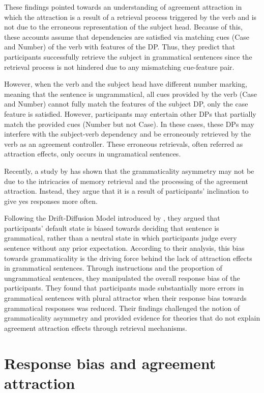 These findings pointed towards an understanding of agreement attraction in which the attraction is a result of a retrieval process triggered by the verb and is not due to the erroneous representation of the subject head. Because of this, these accounts assume that dependencies are satisfied via matching cues ({Case} and {Number}) of the verb with features of the DP. Thus, they predict that participants successfully retrieve the subject in grammatical sentences since the retrieval process is not hindered due to any mismatching cue-feature pair. 

However, when the verb and the subject head have different number marking, meaning that the sentence is ungrammatical, all cues provided by the verb ({Case} and {Number}) cannot fully match the features of the subject DP, only the case feature is satisfied. However, participants may entertain other DPs that partially match the provided cues ({Number} but not {Case}). In these cases, these DPs may interfere with the subject-verb dependency and be erroneously retrieved by the verb as an agreement controller. These erroneous retrievals, often referred as attraction effects, only occurs in ungramatical sentences. 

Recently, a study by  has shown that the grammaticality asymmetry may not be due to the intricacies of memory retrieval and the processing of the agreement attraction. Instead, they argue that it is a result of participants' inclination to give yes responses more often. 

Following the Drift-Diffusion Model introduced by , they argued that participants' default state is biased towards deciding that sentence is grammatical, rather than a neutral state in which participants judge every sentence without any prior expectation. According to their analysis, this bias towards grammaticality is the driving force behind the lack of attraction effects in grammatical sentences. Through instructions and the proportion of ungrammatical sentences, they manipulated the overall response bias of the participants. They found that participants made substantially more errors in grammatical sentences with plural attractor when their response bias towards grammatical responses was reduced. Their findings challenged the notion of grammaticality asymmetry and provided evidence for theories that do not explain agreement attraction effects through retrieval mechanisms.



\section{Response bias and agreement attraction} \label{sec:ddm}

